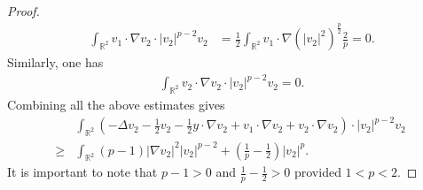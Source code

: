 \documentclass[12pt]{amsart}
\numberwithin{equation}{section}              %
\theoremstyle{remark}
\begin{document}
\begin{proof}
			\begin{equation*}\
				\begin{aligned}
					\int_{\mathbb{R}^2}	 v_1\cdot \nabla v_2\cdot |v_2|^{p-2}v_2
					&= \frac{1}{2}\int_{\mathbb{R}^2}	 v_1\cdot \nabla(|v_2|^{2})^{\frac{p}{2}}\frac{2}{p}=0.
				\end{aligned}
			\end{equation*}
			Similarly, one has
			\begin{equation*}\
				\begin{aligned}
					\int_{\mathbb{R}^2}	 v_2\cdot \nabla v_2\cdot |v_2|^{p-2}v_2
					=0.
				\end{aligned}
			\end{equation*}
			Combining all the above estimates gives
			\begin{equation}\label{eq:est1}
				\begin{aligned}
					&\int_{\mathbb{R}^2}	(-\Delta v_2 -\frac{1}{2}v_2 -\frac{1}{2}y\cdot \nabla v_2+  v_1\cdot \nabla v_2+v_2\cdot \nabla v_2 ) \cdot |v_2|^{p-2}v_2\\
					\geq& \int_{\mathbb{R}^2} (p-1)|\nabla v_2|^2 |v_2|^{p-2} + \left(\frac{1}{p}-\frac{1}{2}\right) |v_2|^{p}.
				\end{aligned}
			\end{equation}
			It is important to note that $p-1>0$ and $\frac{1}{p}-\frac{1}{2}>0$ provided $1<p<2$.


\end{proof}
\end{document}
